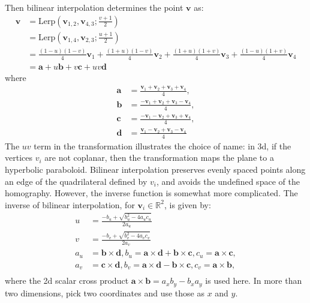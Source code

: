 \documentclass{amsart}[12pt]
\begin{document}
Then bilinear interpolation determines the point $\mathbf v$ as:
\begin{equation}\begin{split}
\mathbf v
& = \mathrm{Lerp}(\mathbf v_{1,2}, \mathbf v_{4,3}; \frac{v+1}{2}) \\
& = \mathrm{Lerp}(\mathbf v_{1,4}, \mathbf v_{2,3}; \frac{u+1}{2}) \\
& = \frac{(1-u)(1-v)}{4} \mathbf v_1 +
\frac{(1+u)(1-v)}{4} \mathbf v_2 +
\frac{(1+u)(1+v)}{4} \mathbf v_3 +
\frac{(1-u)(1+v)}{4} \mathbf v_4 \\
&= \mathbf{a} + u \mathbf{b} + v \mathbf{c} + u v \mathbf{d}
\end{split}\end{equation}
where
\begin{equation}\begin{split}
  \mathbf{a} &= \frac{\mathbf v_1 +\mathbf v_2 +\mathbf v_3 + \mathbf v_4}{4},
  \\
  \mathbf{b} &= \frac{-\mathbf v_1 +\mathbf v_2 +\mathbf v_3 - \mathbf v_4}{4},
  \\
  \mathbf{c} &= \frac{-\mathbf v_1 -\mathbf v_2 +\mathbf v_3 + \mathbf v_4}{4},
  \\
  \mathbf{d} &= \frac{\mathbf v_1 -\mathbf v_2 +\mathbf v_3 - \mathbf v_4}{4}
\end{split}\end{equation}
The $uv$ term in the transformation illustrates the choice of name: in 3d, if
the vertices $v_i$ are not coplanar, then the transformation maps the plane to
a hyperbolic paraboloid. Bilinear interpolation preserves evenly spaced points
along an edge of the quadrilateral defined by $v_i$, and avoids the undefined
space of the homography. However, the inverse function is somewhat more
complicated. The inverse of bilinear interpolation,
for $\mathbf{v}_i \in \mathbb{R}^2$, is given by:
\begin{equation}\begin{split}
 u &= \frac{-b_u + \sqrt{b_u^2 - 4 a_u c_u}}{2a_u}\\
 v &= \frac{-b_v + \sqrt{b_v^2 - 4 a_v c_v}}{2a_v}\\
 a_u &= \mathbf{b} \times \mathbf{d}, b_u = \mathbf{a} \times \mathbf{d} + \mathbf{b} \times \mathbf{c}, c_u = \mathbf{a} \times \mathbf{c},\\
 a_v &= \mathbf{c} \times \mathbf{d}, b_v = \mathbf{a} \times \mathbf{d} - \mathbf{b} \times \mathbf{c}, c_v = \mathbf{a} \times \mathbf{b},\\
\end{split}\end{equation}
where the 2d scalar cross product $\mathbf{a} \times \mathbf{b} = a_x b_y - b_x
a_y$ is used here. In more than two dimensions, pick two coordinates and use
those as $x$ and $y$.
\end{document}
